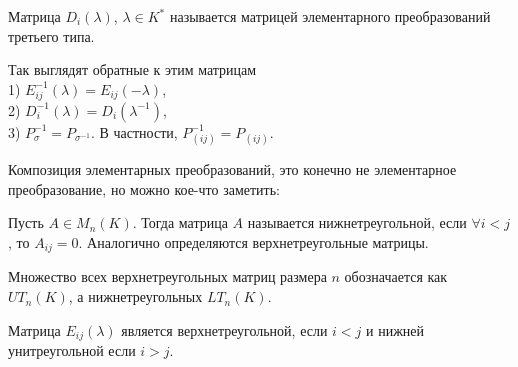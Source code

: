 \dfn Матрица $D_{i}(\lambda)$, $\lambda \in K^*$ называется матрицей элементарного преобразований третьего типа.
\edfn

\rm Так выглядят обратные к этим матрицам\\
1) $E_{ij}^{-1}(\lambda)= E_{ij}(-\lambda)$,\\
2) $D_i^{-1}(\lambda)= D_i(\lambda^{-1})$,\\
3) $P_{\sigma}^{-1}=P_{\sigma^{-1}}$. В частности, $P_{(ij)}^{-1}=P_{(ij)}$.
\erm






Композиция элементарных преобразований, это конечно не элементарное преобразование, но можно кое-что заметить:

\dfn Пусть $A \in M_{n}(K)$. Тогда матрица $A$ называется нижнетреугольной, если $\forall  i<j$, то $A_{ij}=0$. Аналогично определяются верхнетреугольные матрицы. 
\edfn

\dfn Множество всех верхнетреугольных матриц размера $n$ обозначается как $UT_n(K)$, а нижнетреугольных $LT_n(K)$. 
\edfn

\rm Матрица $E_{ij}(\lambda)$ является верхнетреугольной, если $i<j$ и нижней унитреугольной если $i>j$. 
\erm

